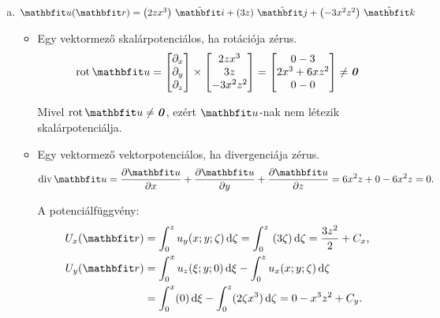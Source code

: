 \documentclass[lang=magyar]{math-handout}
\begin{document}
\begin{exercise}
{\begin{enumerate}[a)]
      \item $\rvec u(\rvec r) = \ijk{2zx^3}{3z}{-3x^2z^2}$
            \begin{itemize}
              \item Egy vektormező skalárpotenciálos, ha rotációja zérus.
                    \[
                      \rot \rvec u
                      =
                      \begin{bmatrix}
                        \partial_x \\ \partial_y \\ \partial_z
                      \end{bmatrix}
                      \times
                      \begin{bmatrix}
                        2zx^3 \\ 3z \\ -3x^2z^2
                      \end{bmatrix}
                      =
                      \begin{bmatrix}
                        0 - 3           \\
                        2 x^3 + 6 x z^2 \\
                        0 - 0
                      \end{bmatrix}
                      \neq
                      \nvec
                    \]

                    Mivel $\rot \rvec u \neq \nvec$, ezért $\rvec u$-nak nem
                    létezik skalárpotenciálja.

              \item Egy vektormező vektorpotenciálos, ha divergenciája zérus.
                    \[
                      \Div \rvec u
                      =
                      \pdv{\rvec u}{x} + \pdv{\rvec u}{y} + \pdv{\rvec u}{z}
                      =
                      6 x^2 z + 0 -6 x^2 z
                      =
                      0
                      \text.
                    \]

                    A potenciálfüggvény:
                    \begin{align*}
                      U_x(\rvec r)
                       & =
                      \int_0^z u_y(x; y; \zeta) \,\diff \zeta
                      =
                      \int_0^z  (3 \zeta) \,\diff \zeta
                      =
                      \frac{3 z^2}{2} + C_x
                      \text,
                      \\
                      U_y(\rvec r)
                       & =
                      \int_0^x u_z(\xi; y; 0) \,\diff \xi -
                      \int_0^z u_x(x; y; \zeta) \,\diff \zeta
                      \\
                       & =
                      \int_0^x (0) \,\diff \xi -
                      \int_0^z (2 \zeta x^3)  \,\diff \zeta
                      =
                      0 - x^3 z^2 + C_y
                      \text.
                    \end{align*}


\end{itemize}
\end{enumerate}}
\end{exercise}
\end{document}
